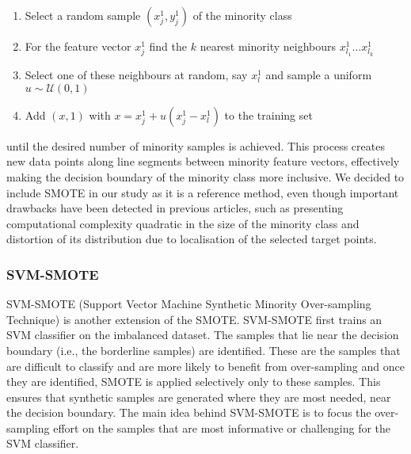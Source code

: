 \begin{enumerate}[label=(\roman*)]
\item Select a random sample $(x_j^1, y_j^1)$ of the minority class
\item For the feature vector $x_j^1$ find the $k$ nearest minority neighbours $x_{l_1}^1 \dots x_{l_k}^1$
\item Select one of these neighbours at random, say $x_{l}^1$ and sample a uniform $u \sim \mathcal{U}(0,1)$
\item Add $(x, 1)$ with $x = x_j^1 + u (x_j^1 - x_l^1)$ to the training set
\end{enumerate}

until the desired number of minority samples is achieved.
This process creates new data points along line segments between minority feature vectors, effectively making the decision boundary of the minority class more inclusive. 
We decided to include SMOTE in our study as it is a reference method, even though important drawbacks have been detected in previous articles, 
such as presenting computational complexity quadratic in the size of the minority class and distortion of its distribution due to localisation of the selected target points.



\begin{comment}
	\begin{figure}[H]
	\label{fig:tube}
	\centering
	\texttt{[image: tube.jpg]}
	\caption{Conservation in thin long tube (3D), with variables varying only in one dimension (from C.P. Fall, 2005)}
	\end{figure}
\end{comment}

\subsubsection{SVM-SMOTE}
SVM-SMOTE (Support Vector Machine Synthetic Minority Over-sampling Technique) is another extension of the SMOTE. SVM-SMOTE first trains an SVM classifier on the imbalanced dataset. The samples that lie near the decision boundary (i.e., the borderline samples) are identified. These are the samples that are difficult to classify and are more likely to benefit from over-sampling and once they are identified, SMOTE is applied selectively only to these samples. This ensures that synthetic samples are generated where they are most needed, near the decision boundary. The main idea behind SVM-SMOTE is to focus the over-sampling effort on the samples that are most informative or challenging for the SVM classifier. \cite{Han2005}

